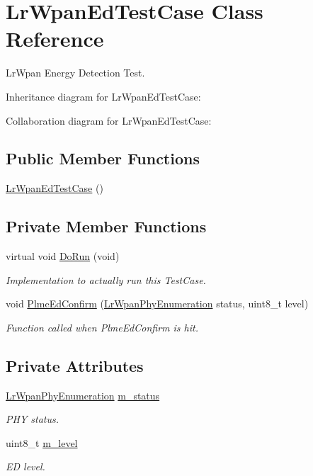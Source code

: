 \hypertarget{classLrWpanEdTestCase}{}\section{Lr\+Wpan\+Ed\+Test\+Case Class Reference}
\label{classLrWpanEdTestCase}


Lr\+Wpan Energy Detection Test.  




Inheritance diagram for Lr\+Wpan\+Ed\+Test\+Case\+:


Collaboration diagram for Lr\+Wpan\+Ed\+Test\+Case\+:
\subsection*{Public Member Functions}
\begin{DoxyCompactItemize}
\item 
\hyperlink{classLrWpanEdTestCase_acf58a034a4ae51e54854c3b4dcd8efd5}{Lr\+Wpan\+Ed\+Test\+Case} ()
\end{DoxyCompactItemize}
\subsection*{Private Member Functions}
\begin{DoxyCompactItemize}
\item 
virtual void \hyperlink{classLrWpanEdTestCase_a432fdebeb0336845350d0b96834ceea4}{Do\+Run} (void)
\begin{DoxyCompactList}\small\item\em Implementation to actually run this Test\+Case. \end{DoxyCompactList}\item 
void \hyperlink{classLrWpanEdTestCase_acbc6e6847dbe21b4984393c0e4d9f57e}{Plme\+Ed\+Confirm} (\hyperlink{group__lr-wpan_ga6494269d13d45c511a07b7ccbb1de754}{Lr\+Wpan\+Phy\+Enumeration} status, uint8\+\_\+t level)
\begin{DoxyCompactList}\small\item\em Function called when Plme\+Ed\+Confirm is hit. \end{DoxyCompactList}\end{DoxyCompactItemize}
\subsection*{Private Attributes}
\begin{DoxyCompactItemize}
\item 
\hyperlink{group__lr-wpan_ga6494269d13d45c511a07b7ccbb1de754}{Lr\+Wpan\+Phy\+Enumeration} \hyperlink{classLrWpanEdTestCase_a412f77be5f81e80661cf8e5563e62851}{m\+\_\+status}
\begin{DoxyCompactList}\small\item\em P\+HY status. \end{DoxyCompactList}\item 
uint8\+\_\+t \hyperlink{classLrWpanEdTestCase_a7ecaee7923b4d55cc4a8545bc0332469}{m\+\_\+level}
\begin{DoxyCompactList}\small\item\em ED level. \end{DoxyCompactList}\end{DoxyCompactItemize}
